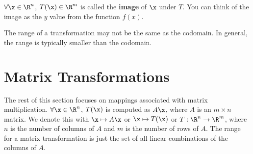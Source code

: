 $\forall \x \in \R^n$, $T(\x) \in \R^m$ is called the
\textbf{image} of $\x$ under $T$. You can think of the image as the $y$ value
from the function $f(x)$.

\begin{note}
  \label{nte:range_may_not_be_the_same_size_as_codomain}

  The range of a transformation may not be the same as the codomain. In general,
  the range is typically smaller than the codomain.
\end{note}

\section{Matrix Transformations}
\label{sec:matrix_transformations}

The rest of this section focuses on mappings associated with matrix
multiplication. $\forall \x \in \R^n$, $T(\x)$ is computed as $A\x$,
where $A$ is an $m \times n$ matrix. We denote this with $\x \mapsto A\x$ or $\x
\mapsto T(\x)$ or $T : \R^n \to \R^m$, where $n$ is the
number of columns of $A$ and $m$ is the number of rows of $A$. The range for a
matrix transformation is just the set of all linear combinations of the columns
of $A$.

